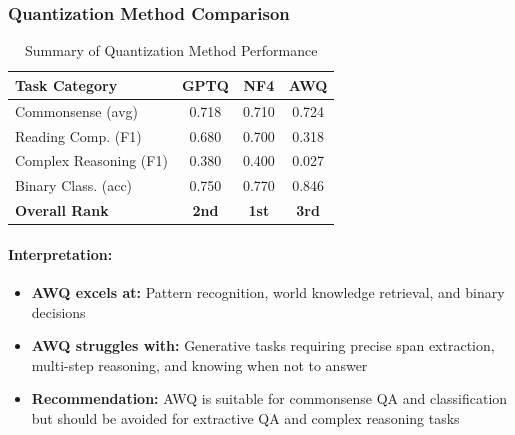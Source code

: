 \documentclass[11pt,a4paper]{article}
\begin{document}
\subsubsection{Quantization Method Comparison}

\begin{table}[H]
\centering
\caption{Summary of Quantization Method Performance}
\begin{tabular}{@{}lccc@{}}
\toprule
\textbf{Task Category} & \textbf{GPTQ} & \textbf{NF4} & \textbf{AWQ} \\
\midrule
Commonsense (avg) & 0.718 & 0.710 & 0.724 \\
Reading Comp. (F1) & 0.680 & 0.700 & 0.318 \\
Complex Reasoning (F1) & 0.380 & 0.400 & 0.027 \\
Binary Class. (acc) & 0.750 & 0.770 & 0.846 \\
\midrule
\textbf{Overall Rank} & \textbf{2nd} & \textbf{1st} & \textbf{3rd} \\
\bottomrule
\end{tabular}
\label{tab:quant_comparison}
\end{table}

\paragraph{Interpretation:}
\begin{itemize}
    \item \textbf{AWQ excels at:} Pattern recognition, world knowledge retrieval, and binary decisions
    \item \textbf{AWQ struggles with:} Generative tasks requiring precise span extraction, multi-step reasoning, and knowing when not to answer
    \item \textbf{Recommendation:} AWQ is suitable for commonsense QA and classification but should be avoided for extractive QA and complex reasoning tasks
\end{itemize}
\end{document}

